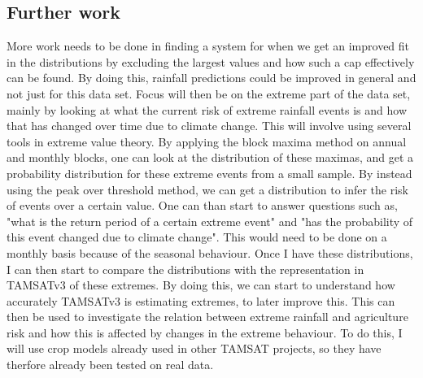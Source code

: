 \documentclass{article}
\begin{document}
	\subsection{Further work}
	More work needs to be done in finding a system for when we get an improved fit in the distributions by excluding the largest values and how such a cap effectively can be found. By doing this, rainfall predictions could be improved in general and not just for this data set. Focus will then be on the extreme part of the data set, mainly by looking at what the current risk of extreme rainfall events is and how that has changed over time due to climate change. This will involve using several tools in extreme value theory. By applying the block maxima method on annual and monthly blocks, one can look at the distribution of these maximas, and get a probability distribution for these extreme events from a small sample. By instead using the peak over threshold method, we can get a distribution to infer the risk of events over a certain value. One can than start to answer questions such as, "what is the return period of a certain extreme event" and "has the probability of this event changed due to climate change". This would need to be done on a monthly basis because of the seasonal behaviour. Once I have these distributions, I can then start to compare the distributions with the representation in TAMSATv3 of these extremes. By doing this, we can start to understand how accurately TAMSATv3 is estimating extremes, to later improve this. This can then be used to investigate the relation between extreme rainfall and agriculture risk and how this is affected by changes in the extreme behaviour. To do this, I will use crop models already used in other TAMSAT projects, so they have therfore already been tested on real data.
	
\end{document}
